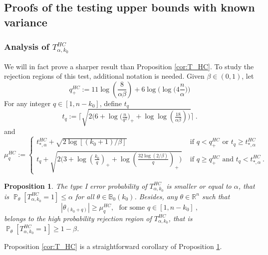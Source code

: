 \documentclass[twoside,11pt]{article}
\newtheorem{prp}{Proposition}
\def\beq{\begin{equation}}
\def\eeq{\end{equation}}
\renewcommand{\P}{\operatorname{\mathbb{P}}}
\newcommand{\<}{\langle}
\renewcommand{\>}{\rangle}
\begin{document}
 
 
 
\subsection{Proofs of the testing upper bounds with known variance}\label{sec:proof_KVUB}	




\subsubsection{Analysis of $T^{HC}_{\alpha,k_0}$}


We will in fact prove a sharper result than Proposition \ref{cor:T_HC}. To study the rejection regions of this test, additional notation is needed. Given  $\beta\in (0,1)$, let
\beq \label{eq:definition_k+}
q^{HC}_{+}:= 11 \log\left(\frac{8}{\alpha \beta}\right)+ 6 \log\Big(\log\Big(4\frac{n}{\alpha}\Big)\Big)
\eeq
For any integer $q\in [1,n-k_0]$, define  $t_{q}$ 
\beq\label{eq:definition_t}
t_{q}:= \Big \lceil \sqrt{2 \big(6+ \log\big(\tfrac{n}{q^2}\big)_+ + \log\log(\tfrac{18}{\alpha\beta}) \big)}\Big\rceil \ .
\eeq
and 
\beq\label{eq:definition_mu}
 \mu^{HC}_{q} := 
 \left\{ \begin{array}{cc} 
t^{HC}_{*,\alpha}+ \sqrt{2\log[(k_0+1)/\beta]} & \text{ if }q< q^{HC}_{+}\text{ or }t_q\geq  t^{HC}_{*,\alpha}          
\\         
t_{q}+ \sqrt{2\big(3+ \log(\tfrac{k_0}{q})_+  + \log(\tfrac{32\log(2/\beta)}{q})_+\big)  }& \text{ if }q\geq q^{HC}_{+}\text{ and }t_q<  t^{HC}_{*,\alpha} \ .
\end{array}
\right.
\eeq



\begin{prp}\label{prp:T_HC_levelpower}
The type I error  probability of  $T^{HC}_{\alpha,k_0}$ is smaller or equal to $\alpha$, that is 
$\P_{\theta}[T^{HC}_{\alpha,k_0}=1]\leq \alpha$ for all $\theta\in \mathbb{B}_0(k_0)$.
 Besides, any $\theta\in \mathbb{R}^n$ such that
$$|\theta_{(k_0+q)}|\geq \mu^{HC}_{q}, ~~~\text{for some } q\in [1,n-k_0]\ ,$$
belongs to the high probability rejection region of $T^{HC}_{\alpha,k_0}$, that is $\P_{\theta}[T^{HC}_{\alpha,k_0}=1]\geq 1-\beta$.
\end{prp}

Proposition \ref{cor:T_HC} is a straightforward corollary of Proposition \ref{prp:T_HC_levelpower}.
\end{document}
